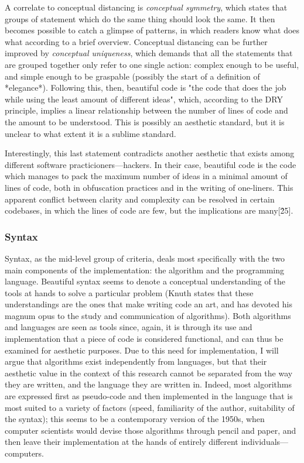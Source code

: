A correlate to conceptual distancing is \emph{conceptual symmetry}, which states that groups of statement which do the same thing should look the same. It then becomes possible to catch a glimpse of patterns, in which readers know what does what according to a brief overview. Conceptual distancing can be further improved by \emph{conceptual uniqueness}, which demands that all the statements that are grouped together only refer to one single action: complex enough to be useful, and simple enough to be graspable (possibly the start of a definition of *elegance*). Following this, then, beautiful code is "the code that does the job while using the least amount of different ideas", which, according to the DRY principle, implies a linear relationship between the number of lines of code and the amount to be understood. This is possibly an aesthetic standard, but it is unclear to what extent it is a sublime standard.

Interestingly, this last statement contradicts another aesthetic that exists among different software practicioners—hackers. In their case, beautiful code is the code which manages to pack the maximum number of ideas in a minimal amount of lines of code, both in obfuscation practices and in the writing of one-liners. This apparent conflict between clarity and complexity can be resolved in certain codebases, in which the lines of code are few, but the implications are many[\^25].

\subsubsection{Syntax}
\label{subsubsec:framework-syntax}

Syntax, as the mid-level group of criteria, deals most specifically with the two main components of the implementation: the algorithm and the programming language. Beautiful syntax seems to denote a conceptual understanding of the tools at hands to solve a particular problem (Knuth states that these understandings are the ones that make writing code an art, and has devoted his magnum opus to the study and communication of algorithms). Both algorithms and languages are seen as tools since, again, it is through its use and implementation that a piece of code is considered functional, and can thus be examined for aesthetic purposes. Due to this need for implementation, I will argue that algorithms exist independently from languages, but that their aesthetic value in the context of this research cannot be separated from the way they are written, and the language they are written in. Indeed, most algorithms are expressed first as pseudo-code and then implemented in the language that is most suited to a variety of factors (speed, familiarity of the author, suitability of the syntax); this seems to be a contemporary version of the 1950s, when computer scientists would devise those algorithms through pencil and paper, and then leave their implementation at the hands of entirely different individuals—computers.

